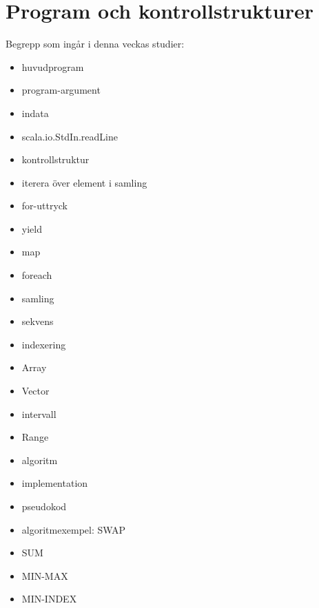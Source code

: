 \chapter{Program och kontrollstrukturer}\label{chapter:W02}
Begrepp som ingår i denna veckas studier:
\begin{itemize}[noitemsep,label={$\square$},leftmargin=*]
\item huvudprogram
\item program-argument
\item indata
\item scala.io.StdIn.readLine
\item kontrollstruktur
\item iterera över element i samling
\item for-uttryck
\item yield
\item map
\item foreach
\item samling
\item sekvens
\item indexering
\item Array
\item Vector
\item intervall
\item Range
\item algoritm
\item implementation
\item pseudokod
\item algoritmexempel: SWAP
\item SUM
\item MIN-MAX
\item MIN-INDEX\end{itemize}
